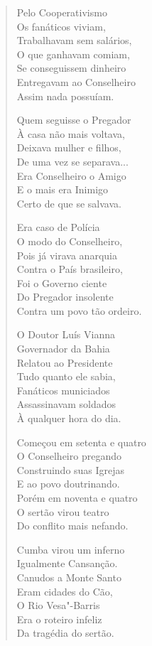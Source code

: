 \begin{verse}
Pelo Cooperativismo \\
Os fanáticos viviam, \\
Trabalhavam sem salários, \\
O que ganhavam comiam, \\
Se conseguissem dinheiro \\
Entregavam ao Conselheiro \\
Assim nada possuíam. 

Quem seguisse o Pregador \\
À casa não mais voltava, \\
Deixava mulher e filhos, \\
De uma vez se separava... \\
Era Conselheiro o Amigo \\
E o mais era Inimigo \\
Certo de que se salvava. 

Era caso de Polícia \\
O modo do Conselheiro, \\
Pois já virava anarquia \\
Contra o País brasileiro, \\
Foi o Governo ciente \\
Do Pregador insolente \\
Contra um povo tão ordeiro.
\pagebreak

O Doutor Luís Vianna \\
Governador da Bahia \\
Relatou ao Presidente \\
Tudo quanto ele sabia, \\
Fanáticos municiados \\
Assassinavam soldados \\
À qualquer hora do dia. 

Começou em setenta e quatro \\
O Conselheiro pregando \\
Construindo suas Igrejas \\
E ao povo doutrinando. \\
Porém em noventa e quatro \\
O sertão virou teatro \\
Do conflito mais nefando. 

Cumba virou um inferno \\
Igualmente Cansanção. \\
Canudos a Monte Santo \\
Eram cidades do Cão, \\
O Rio Vesa"-Barris \\
Era o roteiro infeliz \\
Da tragédia do sertão. 


\end{verse}

